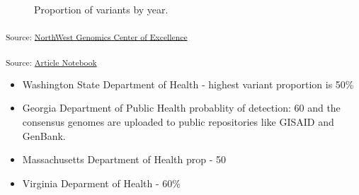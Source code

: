 \documentclass[
  twocolumn]{article}
\providecommand{\tightlist}{%
  \setlength{\itemsep}{0pt}\setlength{\parskip}{0pt}}\usepackage{longtable,booktabs,array}
\begin{document}
\begin{figure}[H]


\caption{\label{fig-countprop}Proportion of variants by year.}

\end{figure}%

\textsubscript{Source:
\href{https://coe-test-org.github.io/sitrep-demo/notebooks/nwcoe-preview.html\#cell-fig-countprop}{NorthWest
Genomics Center of Excellence}}

\textsubscript{Source:
\href{https://coe-test-org.github.io/sitrep-demo/index.qmd.html}{Article
Notebook}}

\begin{itemize}
\tightlist
\item
  Washington State Department of Health - highest variant proportion is
  50\%
\item
  Georgia Department of Public Health probablity of detection: 60 and
  the consensus genomes are uploaded to public repositories like GISAID
  and GenBank.
\item
  Massachusetts Department of Health prop - 50
\item
  Virginia Deparment of Health - 60\%
\end{itemize}
\end{document}

